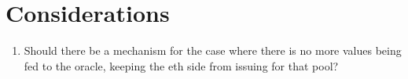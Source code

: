 \documentclass[]{article}
\begin{document}
			\section{Considerations}
				\begin{enumerate}
				\item Should there be a mechanism for the case where there is no more values being fed to the oracle, keeping the eth side from issuing for that pool?
			\end{enumerate}  
			
\end{document}
